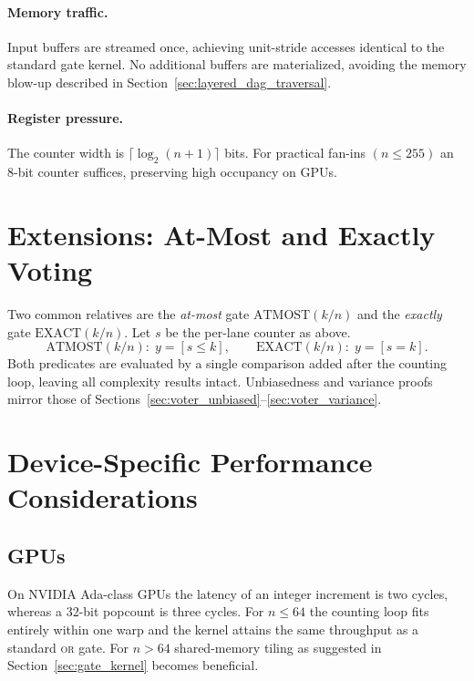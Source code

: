 \paragraph{Memory traffic.}  Input buffers are streamed once, achieving
unit-stride accesses identical to the standard gate kernel.  No additional
buffers are materialized, avoiding the memory blow-up described in
Section~\ref{sec:layered_dag_traversal}.

\paragraph{Register pressure.}  The counter width is $\lceil\log_2(n+1)\rceil$
bits.  For practical fan-ins $(n\le 255)$ an 8-bit counter suffices, preserving
high occupancy on GPUs.

\section{Extensions: At-Most and Exactly Voting}
\label{sec:voter_extensions}

Two common relatives are the \emph{at-most} gate $\mathrm{ATMOST}(k/n)$ and the
\emph{exactly} gate $\mathrm{EXACT}(k/n)$.  Let $s$ be the per-lane counter as
above.
\[
  \mathrm{ATMOST}(k/n):\; y=[s\le k],
  \qquad
  \mathrm{EXACT}(k/n):\; y=[s = k].
\]
Both predicates are evaluated by a single comparison added after the counting
loop, leaving all complexity results intact.  Unbiasedness and variance proofs
mirror those of Sections~\ref{sec:voter_unbiased}–\ref{sec:voter_variance}.

\section{Device-Specific Performance Considerations}
\label{sec:voter_perf}

\subsection{GPUs}
On NVIDIA Ada-class GPUs the latency of an integer increment is two cycles,
whereas a 32-bit popcount is three cycles.  For $n\le 64$ the counting loop
fits entirely within one warp and the kernel attains the same throughput as a
standard \textsc{or} gate.  For $n>64$ shared-memory tiling as suggested in
Section~\ref{sec:gate_kernel} becomes beneficial.

